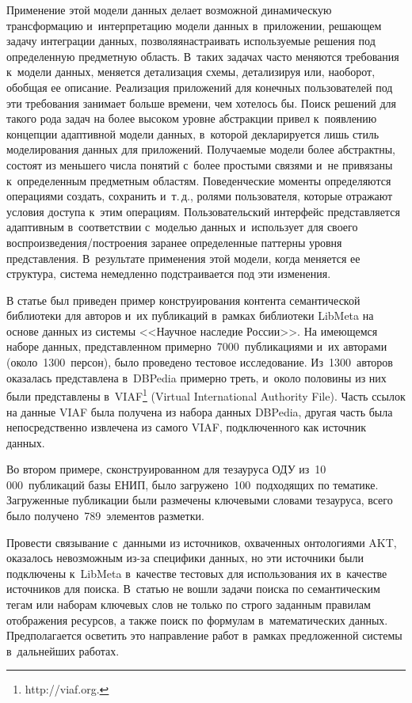 \begin{multicols}{2}
    Применение этой модели данных делает воз\-мож\-ной динамическую 
трансформацию и~ин\-терпретацию модели данных в~приложении, ре\-ша\-ющем 
задачу интеграции данных, позволяя\linebreak настраивать используемые решения под 
определенную предметную область. В~таких задачах часто меняются 
требования к~модели данных, меняется детализация схемы, детализируя или, 
наоборот, обобщая ее описание. Реализация приложений для конечных 
пользователей под эти требования занимает больше времени, чем хотелось 
бы. Поиск решений для такого рода задач на более высоком уровне 
абстракции привел к~появлению концепции адап\-тив\-ной модели данных, 
в~которой декларируется лишь стиль моделирования данных для 
приложений. Получаемые модели более абстрактны, состоят из меньшего 
числа понятий с~более простыми связями и~не привязаны к~определенным 
предметным областям. Поведенческие моменты определяются операциями 
создать, сохранить и~т.\,д., ролями пользователя, которые отражают 
условия доступа к~этим операциям. Пользовательский интерфейс 
представляется адаптивным в~соответствии с~мо\-делью данных и~использует 
для своего вос\-про\-из\-ве\-де\-ния/по\-стро\-ения заранее определенные 
паттерны уровня представления. В~результате применения этой модели, 
когда меняется ее структура, система немедленно подстраивается под эти 
изменения.
    
    В статье был приведен пример конструирования контента семантической 
библиотеки для авторов и~их публикаций в~рамках библиотеки LibMeta на 
основе данных из системы <<Научное наследие России>>. На имеющемся 
наборе данных, пред\-став\-лен\-ном примерно~7000~публикациями и~их 
авторами (около~1300~персон), было проведено тестовое исследование. 
Из~1300~авторов оказалась пред\-став\-ле\-на в~DBPedia примерно треть, и~около 
половины из них были представлены в~VIAF\footnote{{\sf http://viaf.org.}}
(Virtual International Authority File). Часть ссылок на данные 
VIAF была получена из набора данных DBPedia, 
другая часть была непосредственно извлечена из самого VIAF, 
подключенного как источник данных. 
    
    Во втором примере, сконструированном для тезауруса ОДУ 
из~10\,000~публикаций базы ЕНИП, было загружено~100~подходящих по 
тематике. Загруженные публикации были размечены ключевыми словами 
тезауруса, всего было получено~789~элементов разметки.
    
    Провести связывание с~данными из источников, охваченных 
онтологиями AKT, оказалось невозможным из-за специфики данных, но эти 
источники были подключены к~LibMeta в~качестве тестовых для 
использования их в~качестве источников для поиска. В~статью не вошли 
задачи поиска по семантическим тегам или наборам ключевых слов не 
только по строго заданным правилам отоб\-ра\-же\-ния ресурсов, а также поиск 
по формулам в~математических данных. Предполагается 
осветить это направление работ в~рамках предложенной системы 
в~дальнейших работах.
    

\end{multicols}
